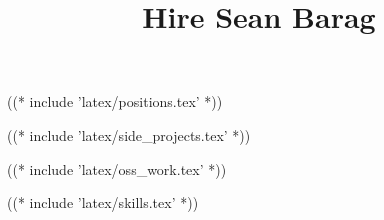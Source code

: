 \documentclass[10pt]{barag_resume}
\title{Hire Sean Barag}
\begin{document}
    ((* include 'latex/positions.tex' *))

    \newpage %
    ((* include 'latex/side_projects.tex' *))

    ((* include 'latex/oss_work.tex' *))

    ((* include 'latex/skills.tex' *))
\end{document}
